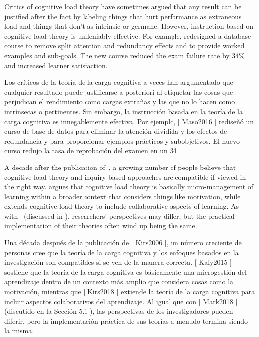 
Critics of cognitive load theory have sometimes argued that
any result can be justified after the fact by labeling things that hurt performance as extraneous load
and things that don't as intrinsic or germane.
However,
instruction based on cognitive load theory is undeniably effective.
For example,
\cite{Maso2016} redesigned a database course to remove split attention and redundancy effects
and to provide worked examples and sub-goals.
The new course reduced the exam failure rate by 34\%
and increased learner satisfaction.

Los críticos de la teoría de la carga cognitiva a veces han argumentado que cualquier resultado puede justificarse a posteriori al etiquetar las cosas que perjudican el rendimiento como cargas extrañas y las que no lo hacen como intrínsecas o pertinentes. Sin embargo, la instrucción basada en la teoría de la carga cognitiva es innegablemente efectiva. Por ejemplo, [ Maso2016 ] rediseñó un curso de base de datos para eliminar la atención dividida y los efectos de redundancia y para proporcionar ejemplos prácticos y subobjetivos. El nuevo curso redujo la tasa de reprobación del examen en un 34%


A decade after the publication of~\cite{Kirs2006},
a growing number of people believe that cognitive load theory and inquiry-based approaches are compatible
if viewed in the right way.
\cite{Kaly2015} argues that cognitive load theory is basically micro-management of learning
within a broader context that considers things like motivation,
while~\cite{Kirs2018} extends cognitive load theory to include collaborative aspects of learning.
As with~\cite{Mark2018} (discussed in ),
researchers' perspectives may differ,
but the practical implementation of their theories often wind up being the same.

Una década después de la publicación de [ Kirs2006 ], un número creciente de personas cree que la teoría de la carga cognitiva y los enfoques basados ​​en la investigación son compatibles si se ven de la manera correcta. [ Kaly2015 ] sostiene que la teoría de la carga cognitiva es básicamente una microgestión del aprendizaje dentro de un contexto más amplio que considera cosas como la motivación, mientras que [ Kirs2018 ] extiende la teoría de la carga cognitiva para incluir aspectos colaborativos del aprendizaje. Al igual que con [ Mark2018 ] (discutido en la Sección  5.1 ), las perspectivas de los investigadores pueden diferir, pero la implementación práctica de sus teorías a menudo termina siendo la misma.

